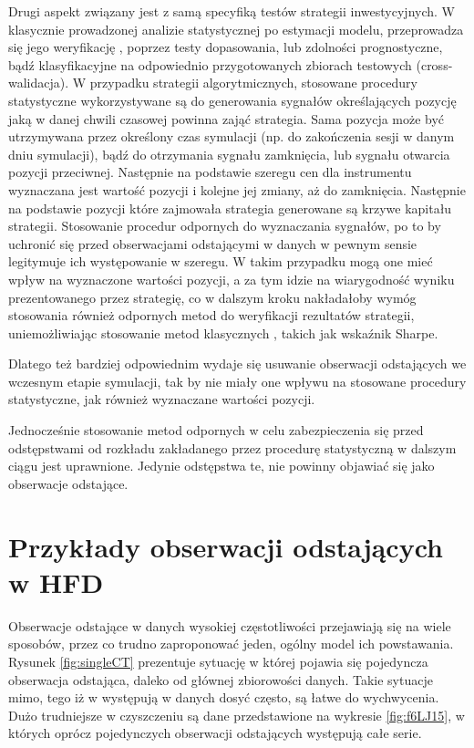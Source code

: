 \documentclass[a4paper,12pt,openany, DIV=calc, headsepline]{scrbook}
\begin{document}
Drugi aspekt związany jest z samą specyfiką testów strategii inwestycyjnych. W klasycznie prowadzonej analizie statystycznej po estymacji modelu, przeprowadza się jego weryfikację , poprzez testy dopasowania, lub zdolności prognostyczne, bądź klasyfikacyjne na odpowiednio przygotowanych zbiorach testowych (cross-walidacja). W przypadku strategii algorytmicznych, stosowane procedury statystyczne wykorzystywane są do generowania sygnałów określających pozycję jaką w danej chwili czasowej powinna zająć strategia. Sama pozycja może być utrzymywana przez określony czas symulacji (np. do zakończenia sesji w danym dniu symulacji), bądź do otrzymania sygnału zamknięcia, lub sygnału otwarcia pozycji przeciwnej. Następnie na podstawie szeregu cen dla instrumentu wyznaczana jest wartość pozycji i kolejne jej zmiany, aż do zamknięcia. Następnie na podstawie pozycji które zajmowała strategia generowane są krzywe kapitału strategii. Stosowanie procedur odpornych do wyznaczania sygnałów, po to by uchronić się przed obserwacjami odstającymi w danych w pewnym sensie legitymuje ich występowanie w szeregu. W takim przypadku mogą one mieć wpływ na wyznaczone wartości pozycji, a za tym idzie na wiarygodność wyniku prezentowanego przez strategię, co w dalszym kroku nakładałoby wymóg stosowania również odpornych metod do weryfikacji rezultatów strategii, uniemożliwiając stosowanie metod klasycznych , takich jak wskaźnik Sharpe.  

Dlatego też bardziej odpowiednim wydaje się usuwanie obserwacji odstających we wczesnym etapie symulacji, tak by nie miały one wpływu na stosowane procedury statystyczne, jak również wyznaczane wartości pozycji.

Jednocześnie stosowanie metod odpornych w celu zabezpieczenia się przed odstępstwami od rozkładu zakładanego przez procedurę statystyczną w dalszym ciągu jest uprawnione. Jedynie odstępstwa te, nie powinny objawiać się jako obserwacje odstające.


\section{Przykłady obserwacji odstających w HFD}

Obserwacje odstające w danych wysokiej częstotliwości przejawiają się na wiele sposobów, przez co trudno zaproponować jeden, ogólny model ich powstawania. Rysunek \ref{fig:singleCT} prezentuje sytuację w której pojawia się pojedyncza obserwacja odstająca, daleko od głównej zbiorowości danych. Takie sytuacje mimo, tego iż w występują w danych dosyć często, są łatwe do wychwycenia. Dużo trudniejsze w czyszczeniu są dane przedstawione na wykresie \ref{fig:f6LJ15}, w których oprócz pojedynczych obserwacji odstających występują całe serie.
\end{document}
